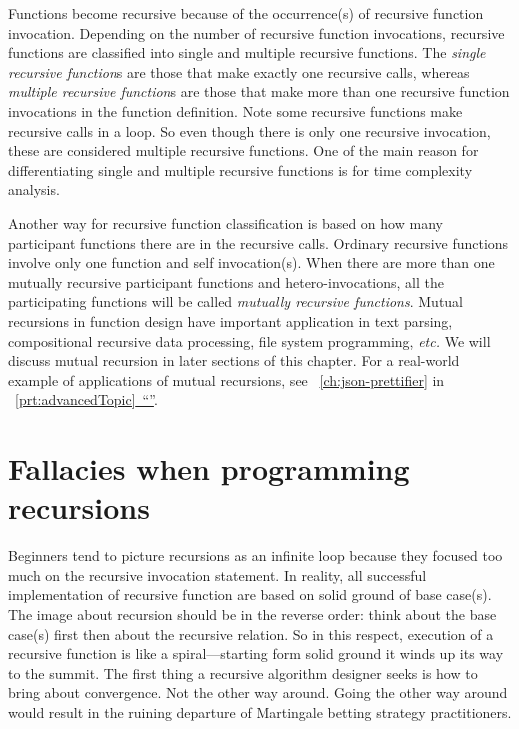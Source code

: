 \documentclass[oneside,11pt]{book}
\theoremstyle{definition}
\theoremstyle{remark}
\newcommand*{\fullref}[1]{\hyperref[{#1}]{\mbox{\autoref*{#1}~}``\nameref*{#1}''}}
\begin{document}
Functions become recursive because of the occurrence(s) of recursive function invocation.
Depending on the number of recursive function invocations, recursive functions are classified
into single and multiple recursive functions.
The \emph{single recursive function}s are those that make exactly one recursive calls, whereas
\emph{multiple recursive function}s are those that make more than one recursive function
invocations in the function definition.
Note some recursive functions make recursive calls in a loop.
So even though there is only one recursive invocation, these are considered multiple recursive
functions.
One of the main reason for differentiating single and multiple recursive functions
is for time complexity analysis.

Another way for recursive function classification is based on how many participant functions
there are in the recursive calls.
Ordinary recursive functions involve only one function and self invocation(s).
When there are more than one mutually recursive participant functions and hetero-invocations, all
the participating functions will be called \emph{mutually recursive functions}.
Mutual recursions in function design have important application in text parsing, compositional
recursive data processing, file system programming, \textit{etc.}
We will discuss mutual recursion in later sections of this chapter.
For a real-world example of applications of mutual recursions, see ~\autoref{ch:json-prettifier} in
~\fullref{prt:advancedTopic}.

\section{Fallacies when programming recursions}\label{sec:recursiveFallacies}

Beginners tend to picture recursions as an infinite loop because they focused too much on the
recursive invocation statement.
In reality, all successful implementation of recursive function are based on solid ground of base
case(s).
The image about recursion should be in the reverse order: think about the base case(s) first then
about the recursive relation.
So in this respect, execution of a recursive function is like a spiral---starting form solid
ground it winds up its way to the summit.
The first thing a recursive algorithm designer seeks is how to bring about convergence.
Not the other way around.
Going the other way around would result in the ruining departure of Martingale betting strategy
practitioners.
\end{document}

